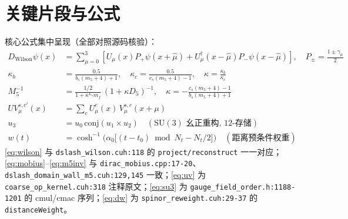 \documentclass[UTF8]{ctexart}
\begin{document}
\section{关键片段与公式}
核心公式集中呈现（全部对照源码核验）：
\begin{align}
D_{\text{Wilson}}\psi(x) &= \sum_{\mu=0}^{3}\left[
  U_\mu(x) P_+ \psi(x+\hat\mu) + U_\mu^\dagger(x-\hat\mu) P_- \psi(x-\hat\mu)\right],
  \quad P_\pm = \frac{1\pm\gamma_\mu}{2} \label{eq:wilson}\\
\kappa_b &= \frac{0.5}{b_s(m_5+4)+1}, \quad
\kappa_c = \frac{0.5}{c_s(m_5+4)-1}, \quad
\kappa = \frac{\kappa_b}{\kappa_c} \label{eq:mobius}\\
M_5^{-1} &= \frac{1/2}{1+\kappa^{L_s}m_f}\,(1+\kappa D_5)^{-1},
  \quad \kappa = -\frac{c_s(m_5+4)-1}{b_s(m_5+4)+1} \label{eq:m5inv}\\
UV^{s,c'}_\mu(x) &= \sum_c U^{c}_\mu(x)\, V^{s,c}_\mu(x+\mu) \label{eq:uv}\\
u_3 &= u_0 \, \mathrm{conj}\!\left(u_1 \times u_2\right) \quad
  (\mathrm{SU}(3)\text{ 幺正重构, 12-存储}) \label{eq:su3}\\
w(t) &= \cosh^{-1}\!\big(\alpha_0 \big[(t-t_0) \bmod N_t - N_t/2\big]\big)
  \quad (\text{距离预条件权重}) \label{eq:dw}
\end{align}
\eqref{eq:wilson} 与 \texttt{\nolinkurl{dslash_wilson.cuh:118}} 的 \texttt{project/reconstruct}
一一对应；\eqref{eq:mobius}--\eqref{eq:m5inv} 与 \texttt{\nolinkurl{dirac_mobius.cpp:17-20}}、
\texttt{\nolinkurl{dslash_domain_wall_m5.cuh:129,145}} 一致；\eqref{eq:uv} 为
\texttt{\nolinkurl{coarse_op_kernel.cuh:318}} 注释原文；\eqref{eq:su3} 为
\texttt{\nolinkurl{gauge_field_order.h:1188-1201}} 的 cmul/cmac 序列；\eqref{eq:dw} 为
\texttt{\nolinkurl{spinor_reweight.cuh:29-37}} 的 \texttt{distanceWeight}。

\end{document}

